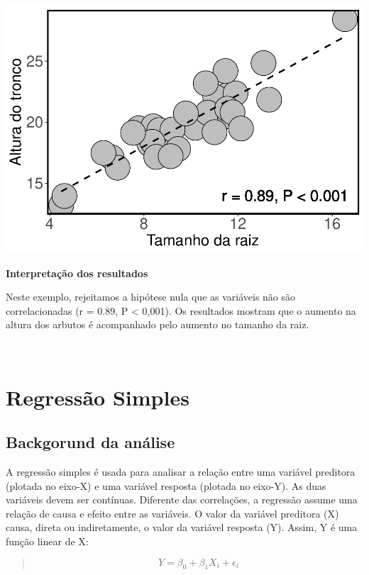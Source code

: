 \documentclass[
]{book}
\begin{document}
\includegraphics{livro_r_ecologia_files/figure-latex/unnamed-chunk-8-1.pdf}

\textbf{Interpretação dos resultados}

Neste exemplo, rejeitamos a hipótese nula que as variáveis não são correlacionadas (r = 0.89, P \textless{} 0,001). Os resultados mostram que o aumento na altura dos arbutos é acompanhado pelo aumento no tamanho da raiz.

~

\hypertarget{regressuxe3o-simples}{%
\section{Regressão Simples}\label{regressuxe3o-simples}}

\hypertarget{backgorund-da-anuxe1lise-3}{%
\subsection{Backgorund da análise}\label{backgorund-da-anuxe1lise-3}}

A regressão simples é usada para analisar a relação entre uma variável preditora (plotada no eixo-X) e uma variável resposta (plotada no eixo-Y). As duas variáveis devem ser contínuas. Diferente das correlações, a regressão assume uma relação de causa e efeito entre as variáveis. O valor da variável preditora (X) causa, direta ou indiretamente, o valor da variável resposta (Y). Assim, Y é uma função linear de X:

\begin{quote}
\[ Y = \beta_0 + \beta_{1}X_i + \epsilon_i \]
\end{quote}
\end{document}
